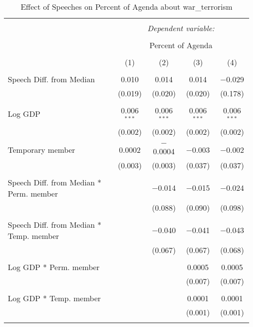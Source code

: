 
\begin{table}[!htbp] \centering 
  \caption{Effect of Speeches on Percent of Agenda about  war_terrorism} 
  \label{} 
\begin{tabular}{@{\extracolsep{5pt}}lcccc} 
\\[-1.8ex]\hline 
\hline \\[-1.8ex] 
 & \multicolumn{4}{c}{\textit{Dependent variable:}} \\ 
\cline{2-5} 
\\[-1.8ex] & \multicolumn{4}{c}{Percent of Agenda} \\ 
\\[-1.8ex] & (1) & (2) & (3) & (4)\\ 
\hline \\[-1.8ex] 
 Speech Diff. from Median & 0.010 & 0.014 & 0.014 & $-$0.029 \\ 
  & (0.019) & (0.020) & (0.020) & (0.178) \\ 
  & & & & \\ 
 Log GDP & 0.006$^{***}$ & 0.006$^{***}$ & 0.006$^{***}$ & 0.006$^{***}$ \\ 
  & (0.002) & (0.002) & (0.002) & (0.002) \\ 
  & & & & \\ 
 Temporary member & 0.0002 & $-$0.0004 & $-$0.003 & $-$0.002 \\ 
  & (0.003) & (0.003) & (0.037) & (0.037) \\ 
  & & & & \\ 
 Speech Diff. from Median * Perm. member &  & $-$0.014 & $-$0.015 & $-$0.024 \\ 
  &  & (0.088) & (0.090) & (0.098) \\ 
  & & & & \\ 
 Speech Diff. from Median * Temp. member &  & $-$0.040 & $-$0.041 & $-$0.043 \\ 
  &  & (0.067) & (0.067) & (0.068) \\ 
  & & & & \\ 
 Log GDP * Perm. member &  &  & 0.0005 & 0.0005 \\ 
  &  &  & (0.007) & (0.007) \\ 
  & & & & \\ 
 Log GDP * Temp. member &  &  & 0.0001 & 0.0001 \\ 
  &  &  & (0.001) & (0.001) \\ 
  & & & & \\ 

\end{tabular}
\end{table}
